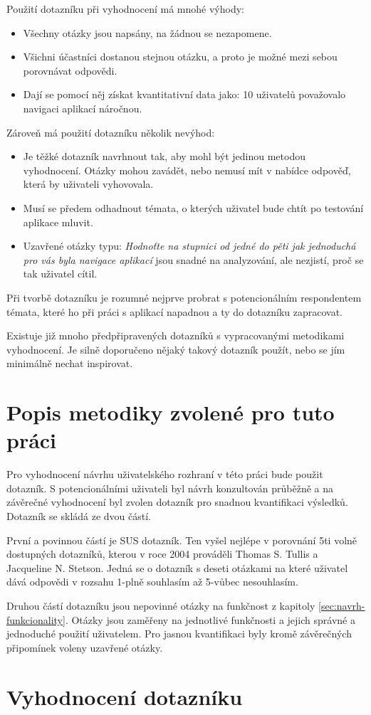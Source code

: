 Použití dotazníku při vyhodnocení má mnohé výhody\cite{stone2005user}:
\begin{itemize}
\item Všechny otázky jsou napsány, na žádnou se nezapomene.
\item Všichni účastníci dostanou stejnou otázku, a proto je možné mezi sebou porovnávat odpovědi.
\item Dají se pomocí něj získat kvantitativní data jako: 10 uživatelů považovalo navigaci aplikací náročnou.
\end{itemize}
Zároveň má použití dotazníku několik nevýhod\cite{stone2005user}:
\begin{itemize}
\item Je těžké dotazník navrhnout tak, aby mohl být jedinou metodou vyhodnocení. Otázky mohou zavádět, nebo nemusí mít v nabídce odpověď, která by uživateli vyhovovala.
\item Musí se předem odhadnout témata, o kterých uživatel bude chtít po testování aplikace mluvit.
\item Uzavřené otázky typu: \emph{Hodnoťte na stupnici od jedné do pěti jak jednoduchá pro vás byla navigace aplikací} jsou snadné na analyzování, ale nezjistí, proč se tak uživatel cítil.
\end{itemize}

Při tvorbě dotazníku je rozumné nejprve probrat s potencionálním respondentem témata, které ho při práci s aplikací napadnou a ty do dotazníku zapracovat\cite{stone2005user}.

Existuje již mnoho předpřipravených dotazníků s vypracovanými metodikami vyhodnocení. Je silně doporučeno nějaký takový dotazník použít, nebo se jím minimálně nechat inspirovat\cite{stone2005user}.

\section{Popis metodiky zvolené pro tuto práci}
\label{sec:metodika-dotaznik}
Pro vyhodnocení návrhu uživatelského rozhraní v této práci bude použit dotazník. S potencionálními uživateli byl návrh konzultován průběžně a na závěrečné vyhodnocení byl zvolen dotazník pro snadnou kvantifikaci výsledků. Dotazník se skládá ze dvou částí.

První a povinnou částí je SUS dotazník. Ten vyšel nejlépe v porovnání 5ti volně dostupných dotazníků, kterou v roce 2004 prováděli Thomas S. Tullis a Jacqueline N. Stetson\cite{tullis2004comparison}. Jedná se o dotazník s deseti otázkami na které uživatel dává odpovědi v rozsahu 1-plně souhlasím až 5-vůbec nesouhlasím.

Druhou částí dotazníku jsou nepovinné otázky na funkčnost z kapitoly \ref{sec:navrh-funkcionality}. Otázky jsou zaměřeny na jednotlivé funkčnosti a jejich správné a jednoduché použití uživatelem. Pro jasnou kvantifikaci byly kromě závěrečných připomínek voleny uzavřené otázky.


\section{Vyhodnocení dotazníku}
